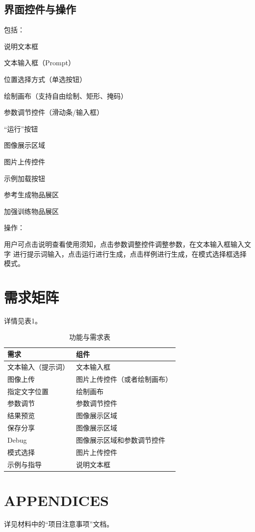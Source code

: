 \documentclass[a4paper,12pt]{article}
\begin{document}
\subsection{界面控件与操作}
\noindent 包括：

说明文本框

文本输入框（Prompt）

位置选择方式（单选按钮）

绘制画布（支持自由绘制、矩形、掩码）

参数调节控件（滑动条/输入框）

“运行”按钮

图像展示区域

图片上传控件

示例加载按钮

参考生成物品展区

加强训练物品展区

\noindent 操作：

用户可点击说明查看使用须知，点击参数调整控件调整参数，在文本输入框输入文字
进行提示词输入，点击运行进行生成，点击样例进行生成，在模式选择框选择模式。
\section{需求矩阵}
详情见表1。
\begin{table}[htbp]
    \centering
    \begin{tabular}{|p{4cm}|p{10cm}|}
      \hline
      \textbf{需求} & \textbf{组件} \\
      \hline
      文本输入（提示词）
        & 文本输入框 \\
      \hline
      图像上传
        &  图片上传控件（或者绘制画布）\\
      \hline
      指定文字位置 
        & 绘制画布 \\
      \hline
      参数调节
        & 参数调节控件 \\
      \hline
      结果预览
        & 图像展示区域 \\
      \hline
      保存分享
        & 图像展示区域 \\
      \hline
      Debug
        & 图像展示区域和参数调节控件 \\
      \hline
      模式选择
        & 图片上传控件 \\
      \hline
      示例与指导
        & 说明文本框 \\
      \hline
    \end{tabular}
    \caption{功能与需求表}
\end{table}
  

\section{APPENDICES}
详见材料中的“项目注意事项”文档。
\end{document}
